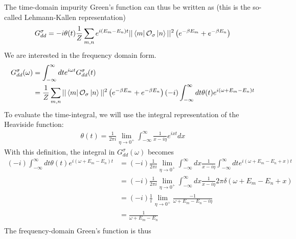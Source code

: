 \documentclass[prb]{revtex4-2}
\begin{document}
The time-domain impurity Green's function can thus be written as (this is the so-called Lehmann-Kallen representation)
\begin{equation}\begin{aligned}
	G_{dd}^\sigma = -i\theta(t)\frac{1}{Z}\sum_{m,n}e^{i\left( E_m - E_n \right)  t}||\bra{m}\mathcal{O}_{\sigma}\ket{n}||^2\left( e^{-\beta E_m} + e^{-\beta E_n}\right)\\
\end{aligned}\end{equation}
We are interested in the frequency domain form.
\begin{equation}\begin{aligned}
	G_{d d}^\sigma(\omega) &= \int_{-\infty}^\infty dt e^{i \omega t}G_{d d}^\sigma(t) \\
			       &= \frac{1}{Z}\sum_{m,n}||\bra{m}\mathcal{O}_{\sigma}\ket{n}||^2\left( e^{-\beta E_m} + e^{-\beta E_n}\right)\left(-i\right)\int_{-\infty}^\infty dt \theta(t)e^{i\left( \omega + E_m - E_n \right)t}
\end{aligned}\end{equation}
To evaluate the time-integral, we will use the integral representation of the Heaviside function:
\begin{equation}\begin{aligned}
	\theta(t) = \frac{1}{2\pi i}\lim_{\eta \to 0^+} \int_{-\infty}^\infty \frac{1}{x- i\eta}e^{ixt}dx
\end{aligned}\end{equation}
With this definition, the integral in \(G_{dd}^\sigma(\omega)\) becomes
\begin{equation}\begin{aligned}
	\left(-i\right)\int_{-\infty}^\infty dt \theta(t)e^{i\left( \omega + E_m - E_n \right)t} &= \left(-i\right)\frac{1}{2\pi i}\lim_{\eta \to 0^+} \int_{-\infty}^\infty dx\frac{1}{x- i\eta}\int_{-\infty}^\infty dt e^{i\left( \omega + E_m - E_n + x\right)t} \\
									     &=\left(-i\right)\frac{1}{2\pi i}\lim_{\eta \to 0^+} \int_{-\infty}^\infty dx\frac{1}{x- i\eta} 2\pi \delta\left( \omega + E_m - E_n + x\right) \\
									     &=\left(-i\right)\frac{1}{i}\lim_{\eta \to 0^+} \frac{-1}{\omega + E_m - E_n- i\eta} \\
									     &=\frac{1}{\omega + E_m - E_n} \\
\end{aligned}\end{equation}
The frequency-domain Green's function is thus
\end{document}
